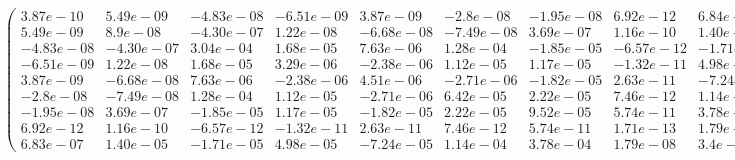 \documentclass[11pt]{article}
\def\be{\begin{equation}}
\def\en{\end{equation}}
\begin{document}
\begin{tiny}
\be
\left( \begin{array}{ccccccccc}
 3.87e-10  &   5.49e-09 &   -4.83e-08 &  -6.51e-09 &  3.87e-09  &  -2.8e-08  & -1.95e-08   & 6.92e-12  &  6.84e-07\\
 5.49e-09   &  8.9e-08  &  -4.30e-07  &  1.22e-08 & -6.68e-08  &  -7.49e-08  &  3.69e-07 &  1.16e-10   & 1.40e-05\\
-4.83e-08  &  -4.30e-07   &  3.04e-04 &   1.68e-05 &  7.63e-06  &   1.28e-04 &  -1.85e-05 & -6.57e-12  & -1.71e-05\\
-6.51e-09  &   1.22e-08  &   1.68e-05  &  3.29e-06 & -2.38e-06  &   1.12e-05  &  1.17e-05 & -1.32e-11  &  4.98e-05\\
 3.87e-09  &  -6.68e-08  &   7.63e-06  & -2.38e-06 &  4.51e-06  &  -2.71e-06 &  -1.82e-05 &  2.63e-11   &-7.24e-05\\
-2.8e-08  &  -7.49e-08  &   1.28e-04  &  1.12e-05 & -2.71e-06  &   6.42e-05  &  2.22e-05  & 7.46e-12   & 1.14e-04\\
-1.95e-08  &   3.69e-07  &  -1.85e-05  &  1.17e-05 & -1.82e-05  &   2.22e-05  &  9.52e-05 &  5.74e-11   & 3.78e-04\\
 6.92e-12  &   1.16e-10  &  -6.57e-12  & -1.32e-11 &  2.63e-11  &   7.46e-12 &   5.74e-11 &  1.71e-13   & 1.79e-08\\
 6.83e-07  &   1.40e-05  &  -1.71e-05  &  4.98e-05 & -7.24e-05  &   1.14e-04  &  3.78e-04 &  1.79e-08   & 3.4e-03
\end{array}
\right)
\en
\end{tiny}
\end{document}
